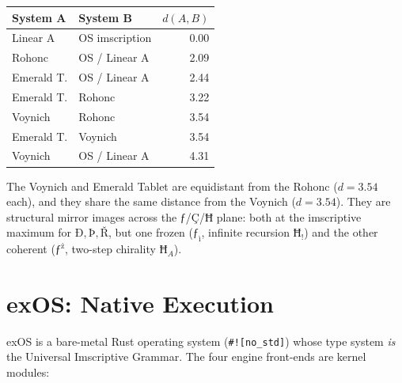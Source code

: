 \documentclass[12pt,a4paper]{article}
\newcommand{\UIG}{Universal Imscriptive Grammar}
\begin{document}
\begin{center}
\small
\begin{tabular}{llr}
\toprule
System A & System B & $d(A,B)$ \\
\midrule
Linear A    & OS imscription  & 0.00 \\
Rohonc      & OS / Linear A   & 2.09 \\
Emerald T.  & OS / Linear A   & 2.44 \\
Emerald T.  & Rohonc          & 3.22 \\
Voynich     & Rohonc          & 3.54 \\
Emerald T.  & Voynich         & 3.54 \\
Voynich     & OS / Linear A   & 4.31 \\
\bottomrule
\end{tabular}
\end{center}

The Voynich and Emerald Tablet are equidistant from the Rohonc ($d = 3.54$ each), and they share the same distance from the Voynich ($d = 3.54$). They are structural mirror images across the $\text{ƒ}$/$\text{Ç}$/$\text{Ħ}$ plane: both at the imscriptive maximum for $\text{Ð}, \text{Þ}, \text{Ř}$, but one frozen ($\text{ƒ}_\text{ì}$, infinite recursion $\text{Ħ}_!$) and the other coherent ($\text{ƒ}^\text{ż}$, two-step chirality $\text{Ħ}_A$).

\section{exOS: Native Execution}
\label{sec:exos}

exOS is a bare-metal Rust operating system (\texttt{\#![no\_std]}) whose type system \emph{is} the \UIG. The four engine front-ends are kernel modules:
\end{document}
